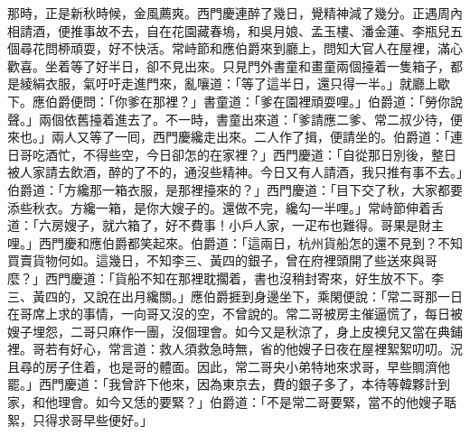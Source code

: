 那時，正是新秋時候，金風薦爽。西門慶連醉了幾日，覺精神減了幾分。正遇周內相請酒，便推事故不去，自在花園藏春塢，和吳月娘、孟玉樓、潘金蓮、李瓶兒五個尋花問桺頑耍，好不快活。{}常峙節和應伯爵來到廳上，問知大官人在屋裡，滿心歡喜。坐着等了好半日，卻不見出來。只見門外書童和畫童兩個擡着一隻箱子，都是綾絹衣服，氣吁吁走進門來，亂嚷道：「等了這半日，還只得一半。」就廳上歇下。應伯爵便問：「你爹在那裡？」書童道：「爹在園裡頑耍哩。」伯爵道：「勞你說聲。」兩個依舊擡着進去了。不一時，書童出來道：「爹請應二爹、常二叔少待，便來也。」兩人又等了一囘，西門慶纔走出來。二人作了揖，便請坐的。伯爵道：「連日哥吃酒忙，不得些空，今日卻怎的在家裡？」西門慶道：「自從那日別後，整日被人家請去飲酒，醉的了不的，通沒些精神。今日又有人請酒，我只推有事不去。」伯爵道：「方纔那一箱衣服，是那裡擡來的？」西門慶道：「目下交了秋，大家都要添些秋衣。方纔一箱，是你大嫂子的。還做不完，纔勾一半哩。」常峙節伸着舌道：「六房嫂子，就六箱了，好不費事！小戶人家，一疋布也難得。哥果是財主哩。」{}西門慶和應伯爵都笑起來。伯爵道：「這兩日，杭州貨船怎的還不見到？不知買賣貨物何如。這幾日，不知李三、黃四的銀子，曾在府裡頭開了些送來與哥麼？」西門慶道：「貨船不知在那裡耽擱着，書也沒稍封寄來，好生放不下。李三、黃四的，又說在出月纔關。」應伯爵捱到身邊坐下，乘閑便說：{}「常二哥那一日在哥席上求的事情，一向哥又沒的空，不曾說的。常二哥被房主催逼慌了，每日被嫂子埋怨，二哥只麻作一團，沒個理會。如今又是秋涼了，身上皮襖兒又當在典鋪裡。哥若有好心，常言道：救人須救急時無，省的他嫂子日夜在屋裡絮絮叨叨。況且尋的房子住着，也是哥的體面。因此，常二哥央小弟特地來求哥，早些賙濟他罷。」西門慶道：「我曾許下他來，因為東京去，費的銀子多了，本待等韓夥計到家，和他理會。如今又恁的要緊？」伯爵道：「不是常二哥要緊，當不的他嫂子聒絮，只得求哥早些便好。」

